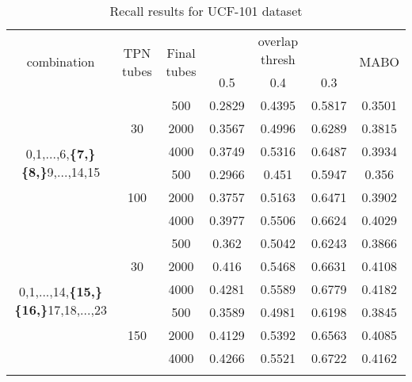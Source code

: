 \begin{center}
\begin{longtable}{||c | c | c ||c c c | c|}

  \hline
  \multirow{2}{*}{combination} & \multirow{2}{2.5em}{TPN tubes} & \multirow{2}{2.5em}{Final tubes} &  {} & overlap thresh & {} & \multirow{2}{*}{MABO} \\
  {} & {} & {} &  0.5 &  0.4 & 0.3 & {}\\         
  \hline
  
  \multirow{6}{7em}{0,1,...,6,\textbf{\{7,\}}
  \textbf{\{8,\}}9,...,14,15 }  & \multirow{3}{*}{30} & 500   & 0.2829  & 0.4395 & 0.5817  & 0.3501 \\
  \cline{3-7}
  {} &  {}   & 2000   & 0.3567  & 0.4996 & 0.6289 & 0.3815\\
  \cline{3-7}
  {} &  {}   & 4000   & 0.3749  & 0.5316 & 0.6487 & 0.3934 \\
  \cline{2-7}
  {} &  \multirow{3}{*}{100}   & 500   & 0.2966  & 0.451 & 0.5947 & 0.356 \\
  \cline{3-7}
  {} &  {}   & 2000   & 0.3757  & 0.5163 & 0.6471 & 0.3902 \\
  \cline{3-7}
  {} &  {}   & 4000  & 0.3977  & 0.5506 & 0.6624 & 0.4029 \\
  \hline                                    
  \multirow{6}{7em}{0,1,...,14,\textbf{\{15,\}}
  \textbf{\{16,\}}17,18,...,23 }  & \multirow{3}{*}{30} & 500   & 0.362  & 0.5042 & 0.6243 & 0.3866 \\
  \cline{3-7}
  {} &  {}   & 2000   & 0.416  & 0.5468 & 0.6631 & 0.4108  \\
  \cline{3-7}
  {} &  {}   & 4000   & 0.4281  & 0.5589  & 0.6779 & 0.4182 \\
  \cline{2-7}
  {} &  \multirow{3}{*}{150}   & 500 & 0.3589  & 0.4981 & 0.6198 & 0.3845 \\
  \cline{3-7}
  {} &  {}   & 2000   & 0.4129  & 0.5392  & 0.6563 & 0.4085 \\
  \cline{3-7}
  {} &  {}   & 4000   & 0.4266  & 0.5521 & 0.6722 & 0.4162\\
  \hline                                    

  \caption{Recall results for UCF-101 dataset}
  \label{table:ucf_recall}
\end{longtable} 
\end{center}

